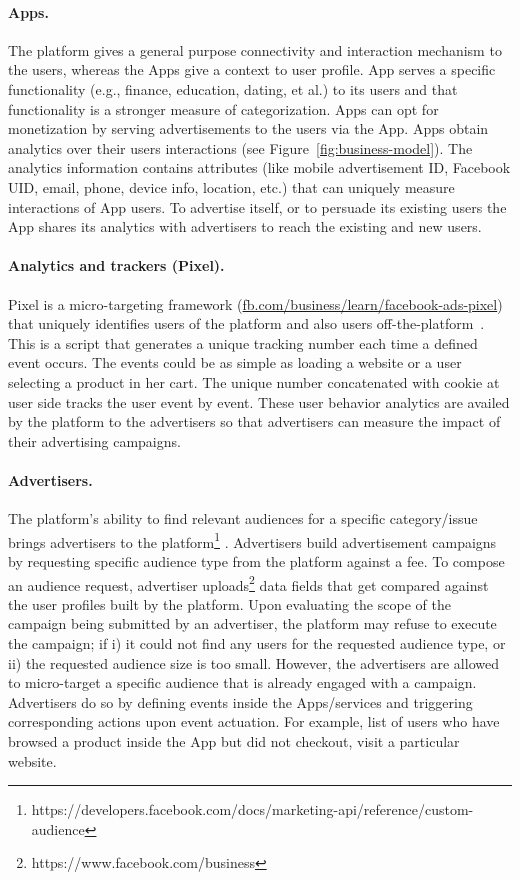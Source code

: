 \documentclass[a4paper,twoside]{article}
\begin{document}
\paragraph{Apps.}
The platform gives a general purpose connectivity and interaction
mechanism to the users, whereas the Apps give a context to user
profile. App serves a specific functionality (e.g., finance,
education, dating, et al.) to its users and that functionality is a
stronger measure of categorization. Apps can opt for monetization by
serving advertisements to the users via the App. Apps obtain analytics
over their users interactions (see
Figure~\ref{fig:business-model}). The analytics information contains
attributes (like mobile advertisement ID, Facebook UID, email, phone,
device info, location, etc.) that can uniquely measure interactions of
App users. To advertise itself, or to persuade its existing users the
App shares its analytics with advertisers to reach the existing and
new users.

\paragraph{Analytics and trackers (Pixel).}
Pixel is a micro-targeting framework
(\url{fb.com/business/learn/facebook-ads-pixel}) that uniquely
identifies users of the platform and also users
off-the-platform~\cite{social-plugins,web-never-forgets}. This is a
script that generates a unique tracking number each time a defined
event occurs. The events could be as simple as loading a website or a
user selecting a product in her cart. The unique number concatenated
with cookie at user side tracks the user event by event. These user
behavior analytics are availed by the platform to the advertisers so
that advertisers can measure the impact of their advertising
campaigns.

\paragraph{Advertisers.}
The platform's ability to find relevant audiences for a specific
category/issue brings advertisers to the
platform\footnote{https://developers.facebook.com/docs/marketing-api/reference/custom-audience}
. Advertisers build advertisement campaigns by requesting specific
audience type from the platform against a fee. To compose an audience
request, advertiser
uploads\footnote{https://www.facebook.com/business} data fields that
get compared against the user profiles built by the platform. Upon
evaluating the scope of the campaign being submitted by an advertiser,
the platform may refuse to execute the campaign; if i) it could not
find any users for the requested audience type, or ii) the requested
audience size is too small. However, the advertisers are allowed to
micro-target a specific audience that is already engaged with a
campaign. Advertisers do so by defining events inside the
Apps/services and triggering corresponding actions upon event
actuation. For example, list of users who have browsed a product
inside the App but did not checkout, visit a particular website.
\end{document}
